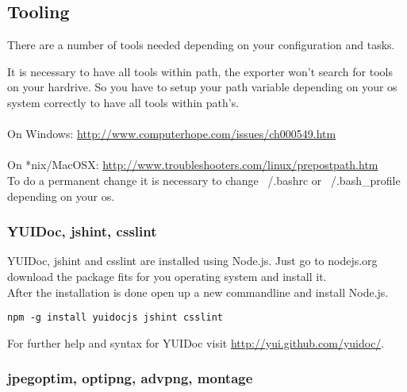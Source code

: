 \subsection{Tooling}
There are a number of tools needed depending on your configuration and tasks.\\

\begin{itemize}
\end{itemize}

\noindent It is necessary to have all tools within path, the exporter won't search for tools on your hardrive. So you have to setup your path variable depending on your os system correctly to have all tools within path's.\\
\\
On Windows: \url{http://www.computerhope.com/issues/ch000549.htm}\\
\\
On *nix/MacOSX: \url{http://www.troubleshooters.com/linux/prepostpath.htm}\\
To do a permanent change it is necessary to change ~/.bashrc or ~/.bash\_profile depending on your os.

\subsubsection{YUIDoc, jshint, csslint}
YUIDoc, jshint and csslint are installed using Node.js. Just go to nodejs.org download the package fits for you operating system and install it. \\
After the installation is done open up a new commandline and install Node.js.

\begin{verbatim}
npm -g install yuidocjs jshint csslint
\end{verbatim}

\noindent For further help and syntax for YUIDoc visit \url{http://yui.github.com/yuidoc/}.


\subsubsection{jpegoptim, optipng, advpng, montage}

